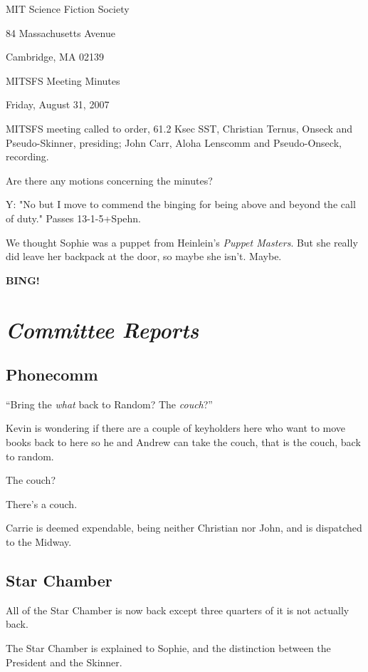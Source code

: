 \documentclass[10pt]{article}
\newcommand{\bing}{{\bf BING!} }
\newcommand{\goto}[1]{\bing \vskip 12pt \section*{{\em{#1}}}}
\begin{document}
\begin{center}

MIT Science Fiction Society

84 Massachusetts Avenue

Cambridge, MA 02139

\vspace{12pt}

MITSFS Meeting Minutes

Friday, August 31, 2007

\end{center}

\vspace{18pt}

\setlength{\parskip}{6pt}

\noindent
MITSFS meeting called to order, 61.2 Ksec SST,
Christian Ternus, Onseck and Pseudo-Skinner, presiding;
John Carr, Aloha Lenscomm and Pseudo-Onseck, recording.

Are there any motions concerning the minutes?

Y: "No but I move to commend the binging for being above and beyond
the call of duty."  Passes \hbox{13-1-5+Spehn}.

We thought Sophie was a puppet from Heinlein's {\em Puppet Masters}.
But she really did leave her backpack at the door, so maybe she
isn't.  Maybe.

\goto{Committee Reports}

\subsection*{Phonecomm}
``Bring the {\em what} back to Random?  The {\em couch}?''

Kevin is wondering if there are a couple of keyholders here
who want to move books back to here so he and Andrew can take
the couch, that is the couch, back to random.

The couch?

There's a couch.

Carrie is deemed expendable, being neither Christian nor John,
and is dispatched to the Midway.

\subsection*{Star Chamber}
All of the Star Chamber is now back except three quarters of
it is not actually back.

The Star Chamber is explained to Sophie, and the distinction
between the President and the Skinner.
\end{document}

